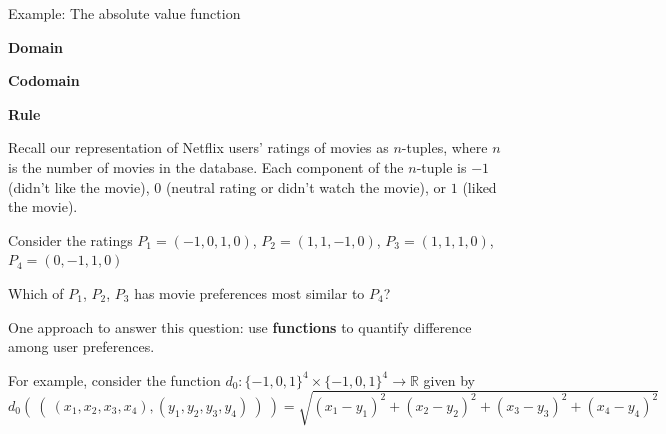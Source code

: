 \documentclass[12pt, oneside]{article}
\newcommand{\cmark}{\ding{51}}
\newcommand{\xmark}{\ding{55}}
\begin{document}

\vfill
\newpage

Example: The absolute value function 

{\bf Domain}

{\bf Codomain}

{\bf Rule}

\vfill 
 

Recall our representation of Netflix users' ratings of movies as $n$-tuples, where
$n$ is the number of movies in the database. 
Each component of the $n$-tuple is $-1$ (didn't like the movie), $0$ 
(neutral rating or didn't watch the movie), or $1$ (liked the movie).

Consider the ratings $P_1 = (-1, 0, 1, 0)$, $P_2 = (1, 1, -1, 0)$, $P_3 = (1, 1, 1, 0)$,
$P_4 = (0,-1,1, 0)$


Which of $P_1$, $P_2$, $P_3$ has movie preferences most similar to $P_4$?

One approach to answer this question: use {\bf functions} to quantify difference among user preferences.

For example, consider the function 
$d_0: \{-1,0,1\}^4 \times \{-1,0,1\}^4 \to \mathbb{R}$
given by
\[
d_0 (~(~ (x_1, x_2, x_3, x_4), (y_1, y_2, y_3, y_4) ~) ~) = \sqrt{ (x_1 - y_1)^2 + (x_2 - y_2)^2 + (x_3 -y_3)^2 + (x_4 -y_4)^2}
\]


\vfill
\vfill

\newpage 
\end{document}
